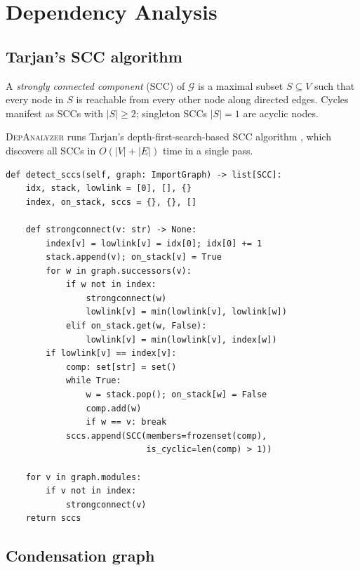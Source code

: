 \documentclass[11pt]{article}
\newcommand{\IG}{\mathcal{G}}              %
\newcommand{\DA}{\textsc{DepAnalyzer}}     %
\begin{document}
\section{Dependency Analysis}
\label{sec:analysis}

\subsection{Tarjan's SCC algorithm}

A \emph{strongly connected component} (SCC) of $\IG$ is a maximal subset
$S \subseteq V$ such that every node in $S$ is reachable from every
other node along directed edges.  Cycles manifest as SCCs with
$|S| \geq 2$; singleton SCCs $|S| = 1$ are acyclic nodes.

\DA{} runs Tarjan's depth-first-search-based SCC algorithm
\cite{tarjan}, which discovers all SCCs in $O(|V| + |E|)$ time in a
single pass.

\begin{lstlisting}[style=jugeo-python,
  caption={SCC detection in \texttt{CircularImportDetector}.},
  label={lst:scc}]
def detect_sccs(self, graph: ImportGraph) -> list[SCC]:
    idx, stack, lowlink = [0], [], {}
    index, on_stack, sccs = {}, {}, []

    def strongconnect(v: str) -> None:
        index[v] = lowlink[v] = idx[0]; idx[0] += 1
        stack.append(v); on_stack[v] = True
        for w in graph.successors(v):
            if w not in index:
                strongconnect(w)
                lowlink[v] = min(lowlink[v], lowlink[w])
            elif on_stack.get(w, False):
                lowlink[v] = min(lowlink[v], index[w])
        if lowlink[v] == index[v]:
            comp: set[str] = set()
            while True:
                w = stack.pop(); on_stack[w] = False
                comp.add(w)
                if w == v: break
            sccs.append(SCC(members=frozenset(comp),
                            is_cyclic=len(comp) > 1))

    for v in graph.modules:
        if v not in index:
            strongconnect(v)
    return sccs
\end{lstlisting}

\subsection{Condensation graph}
\end{document}

